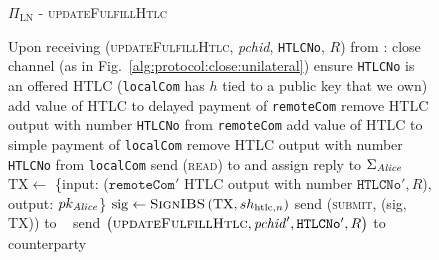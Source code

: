   \begin{figure}[H]
    \begin{protocolbox}{$\Pi_{\mathrm{LN}}$ - \textsc{updateFulfillHtlc}}
      \begin{algorithmic}[1]
        \State Upon receiving (\textsc{updateFulfillHtlc}, \textit{pchid},
        \texttt{HTLCNo}, $R$) from \bob:
        \Indent
            \State close channel (as in
            Fig.~\ref{alg:protocol:close:unilateral})
            \State \Return
          \EndIf
          \State ensure \texttt{HTLCNo} is an offered HTLC (\texttt{localCom}
          has $h$ tied to a public key that we own)
          \State add value of HTLC to delayed payment of \texttt{remoteCom}
          \State remove HTLC output with number \texttt{HTLCNo} from
          \texttt{remoteCom}
          \State add value of HTLC to simple payment of \texttt{localCom}
          \State remove HTLC output with number \texttt{HTLCNo} from
          \texttt{localCom}
           
            \State send (\textsc{read}) to \ledger{} and assign reply to
            $\Sigma_{\mathit{Alice}}$
              \State $\mathrm{TX} \gets$ \{input: ($\mathtt{remoteCom}'$ HTLC
              output with number $\mathtt{HTLCNo}', R$), output:
              $pk_{\mathit{Alice}}$\}
              \State $\mathrm{sig} \gets \textsc{SignIBS}\left(\mathrm{TX},
              sh_{\mathrm{htlc}, n}\right)$
              \State send (\textsc{submit}, (sig, TX)) to \ledger{}
              \label{alg:protocol:pay:updateFulfillHtlc:submit}
            \Else \ 
              \State {}
              \State send $\left(\textsc{updateFulfillHtlc}, \mathit{pchid}',
              \mathtt{HTLCNo}', R\right)$ to counterparty
            \EndIf
          \EndIf
        \EndIndent
      \end{algorithmic}
    \end{protocolbox}
    \caption{}
    \label{alg:protocol:pay:updateFulfillHtlc}
  \end{figure}


